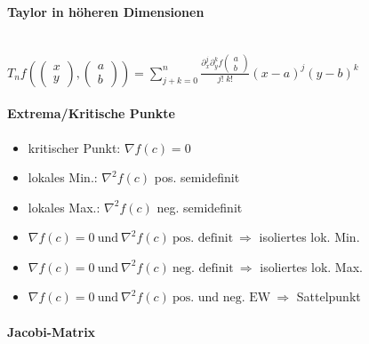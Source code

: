 \documentclass[paper=a3,paper=landscape, fontsize=9pt, DIV=30]{scrartcl}
\begin{document}
\begin{multicols*}{4}
 \paragraph{Taylor in höheren Dimensionen}\hspace{0pt}\\
 $T_nf((\begin{smallmatrix} x\\y \end{smallmatrix}), (\begin{smallmatrix} a\\b \end{smallmatrix})) = \sum_{j+k=0}^{n} \frac{\partial_x^j\partial_y^kf(\begin{smallmatrix} a\\b \end{smallmatrix})}{j! \; k!} (x-a)^j(y-b)^k$

  \paragraph{Extrema/Kritische Punkte}
  \begin{itemize}
  	\item kritischer Punkt: $\nabla f(c) = 0$
  	\item lokales Min.: $\nabla^2f(c)$ pos. semidefinit
  	\item lokales Max.: $\nabla^2f(c)$ neg. semidefinit
  	\item $\nabla f(c)=0 \ \text{und}\ \nabla^2f(c) \ \text{pos. definit}\ \Rightarrow$ isoliertes lok. Min.
  	\item  $\nabla f(c)=0 \ \text{und}\ \nabla^2f(c) \ \text{neg. definit}\ \Rightarrow$ isoliertes lok. Max.
  	\item $\nabla f(c)=0 \ \text{und}\ \nabla^2f(c) \ \text{pos. und neg. EW}\ \Rightarrow$ Sattelpunkt
  \end{itemize}

  \paragraph{Jacobi-Matrix}


\end{multicols*}
\end{document}
